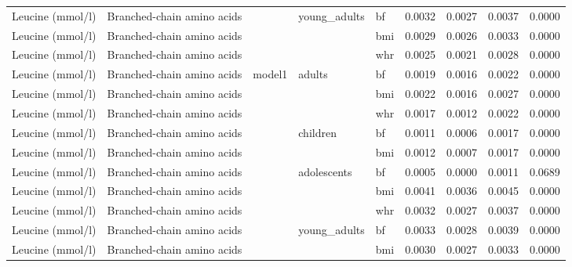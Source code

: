 \documentclass[11pt,twoside]{bristolthesis}
\begin{document}
\begin{longtable}[t]{lllllrrrr}
\cmidrule{5-9}\nopagebreak
Leucine (mmol/l) & Branched-chain amino acids &  & \multirow{-3}{*}{\raggedright\arraybackslash young\_adults} & bf & 0.0032 & 0.0027 & 0.0037 & 0.0000\\
\cmidrule{1-2}
\cmidrule{4-9}\nopagebreak
Leucine (mmol/l) & Branched-chain amino acids &  &  & bmi & 0.0029 & 0.0026 & 0.0033 & 0.0000\\
\cmidrule{1-2}
\cmidrule{5-9}\nopagebreak
Leucine (mmol/l) & Branched-chain amino acids &  &  & whr & 0.0025 & 0.0021 & 0.0028 & 0.0000\\
\cmidrule{1-2}
\cmidrule{5-9}\nopagebreak
Leucine (mmol/l) & Branched-chain amino acids & \multirow{-11}{*}{\raggedright\arraybackslash model1} & \multirow{-3}{*}{\raggedright\arraybackslash adults} & bf & 0.0019 & 0.0016 & 0.0022 & 0.0000\\
\cmidrule{1-9}\pagebreak[0]
Leucine (mmol/l) & Branched-chain amino acids &  &  & bmi & 0.0022 & 0.0016 & 0.0027 & 0.0000\\
\cmidrule{1-2}
\cmidrule{5-9}\nopagebreak
Leucine (mmol/l) & Branched-chain amino acids &  &  & whr & 0.0017 & 0.0012 & 0.0022 & 0.0000\\
\cmidrule{1-2}
\cmidrule{5-9}\nopagebreak
Leucine (mmol/l) & Branched-chain amino acids &  & \multirow{-3}{*}{\raggedright\arraybackslash children} & bf & 0.0011 & 0.0006 & 0.0017 & 0.0000\\
\cmidrule{1-2}
\cmidrule{4-9}\nopagebreak
Leucine (mmol/l) & Branched-chain amino acids &  &  & bmi & 0.0012 & 0.0007 & 0.0017 & 0.0000\\
\cmidrule{1-2}
\cmidrule{5-9}\nopagebreak
Leucine (mmol/l) & Branched-chain amino acids &  & \multirow{-2}{*}{\raggedright\arraybackslash adolescents} & bf & 0.0005 & 0.0000 & 0.0011 & 0.0689\\
\cmidrule{1-2}
\cmidrule{4-9}\nopagebreak
Leucine (mmol/l) & Branched-chain amino acids &  &  & bmi & 0.0041 & 0.0036 & 0.0045 & 0.0000\\
\cmidrule{1-2}
\cmidrule{5-9}\nopagebreak
Leucine (mmol/l) & Branched-chain amino acids &  &  & whr & 0.0032 & 0.0027 & 0.0037 & 0.0000\\
\cmidrule{1-2}
\cmidrule{5-9}\nopagebreak
Leucine (mmol/l) & Branched-chain amino acids &  & \multirow{-3}{*}{\raggedright\arraybackslash young\_adults} & bf & 0.0033 & 0.0028 & 0.0039 & 0.0000\\
\cmidrule{1-2}
\cmidrule{4-9}\nopagebreak
Leucine (mmol/l) & Branched-chain amino acids &  &  & bmi & 0.0030 & 0.0027 & 0.0033 & 0.0000\\

\end{longtable}
\end{document}
